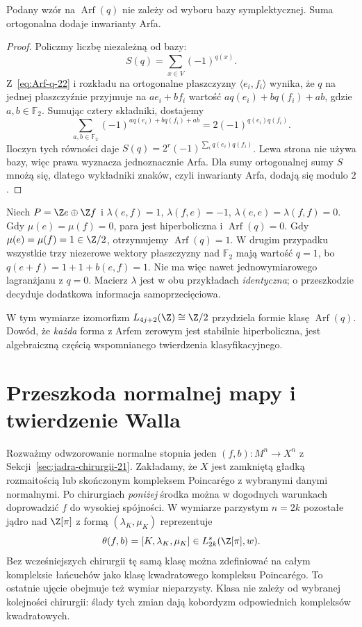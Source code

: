 \begin{stwierdzenie}
\label{prop:Arf-baza-22}
Podany wzór na $\operatorname{Arf}(q)$ nie zależy
od wyboru bazy symplektycznej. Suma ortogonalna
dodaje inwarianty Arfa.
\end{stwierdzenie}
\begin{proof}
Policzmy liczbę niezależną od bazy:
\[
 S(q)=\sum_{x\in V}(-1)^{q(x)}.
\]
Z~\eqref{eq:Arf-q-22} i rozkładu na ortogonalne
płaszczyzny $\langle e_i,f_i\rangle$ wynika,
że $q$ na jednej płaszczyźnie przyjmuje na
$ae_i+bf_i$ wartość
$a q(e_i)+bq(f_i)+ab$, gdzie $a,b\in\mathbb F_2$.
Sumując cztery składniki, dostajemy
\[
 \sum_{a,b\in\mathbb F_2}
  (-1)^{a q(e_i)+bq(f_i)+ab}
     =2(-1)^{q(e_i)q(f_i)}.
\]
Iloczyn tych równości daje
$S(q)=2^r(-1)^{\sum_iq(e_i)q(f_i)}$.
Lewa strona nie używa bazy, więc prawa
wyznacza jednoznacznie Arfa. Dla sumy
ortogonalnej sumy $S$ mnożą się, dlatego
wykładniki znaków, czyli inwarianty Arfa,
dodają się modulo $2$.
\end{proof}

\begin{przyklad}
\label{prz:Arf-dwie-22}
Niech $P=\Z e\oplus\Z f$ i
$\lambda(e,f)=1$, $\lambda(f,e)=-1$,
$\lambda(e,e)=\lambda(f,f)=0$.
Gdy $\mu(e)=\mu(f)=0$, para jest hiperboliczna
i $\operatorname{Arf}(q)=0$. Gdy
$\mu(e)=\mu(f)=1\in\Z/2$, otrzymujemy
$\operatorname{Arf}(q)=1$.
W drugim przypadku wszystkie trzy niezerowe
wektory płaszczyzny nad $\mathbb F_2$ mają
wartość $q=1$, bo
$q(e+f)=1+1+b(e,f)=1$.
Nie ma więc nawet jednowymiarowego
lagranżjanu z $q=0$. Macierz $\lambda$
jest w obu przykładach \emph{identyczna};
o przeszkodzie decyduje dodatkowa informacja
samoprzecięciowa.
\end{przyklad}

W tym wymiarze izomorfizm
$L_{4j+2}(\Z)\cong\Z/2$ przydziela formie
klasę $\operatorname{Arf}(q)$. Dowód, że
\emph{każda} forma z Arfem zerowym jest
stabilnie hiperboliczna, jest algebraiczną
częścią wspomnianego twierdzenia klasyfikacyjnego.

\section{Przeszkoda normalnej mapy i twierdzenie Walla}
\label{sec:tw-Walla-22}

Rozważmy odwzorowanie normalne stopnia jeden
$(f,b):M^n\to X^n$ z
Sekcji~\ref{sec:jadra-chirurgii-21}.
Zakładamy, że $X$ jest zamkniętą gładką
rozmaitością lub skończonym kompleksem
Poincarégo z wybranymi danymi normalnymi.
Po chirurgiach \emph{poniżej} środka można
w dogodnych warunkach doprowadzić $f$ do
wysokiej spójności. W wymiarze parzystym
$n=2k$ pozostałe jądro nad $\Z[\pi]$
z formą $(\lambda_K,\mu_K)$ reprezentuje
\[
 \theta(f,b)=[K,\lambda_K,\mu_K]
       \in L^s_{2k}(\Z[\pi],w).
\]
Bez wcześniejszych chirurgii tę samą klasę
można zdefiniować na całym kompleksie łańcuchów
jako klasę kwadratowego kompleksu Poincarégo.
To ostatnie ujęcie obejmuje też wymiar nieparzysty.
Klasa nie zależy od wybranej kolejności
chirurgii: ślady tych zmian dają kobordyzm
odpowiednich kompleksów kwadratowych.

